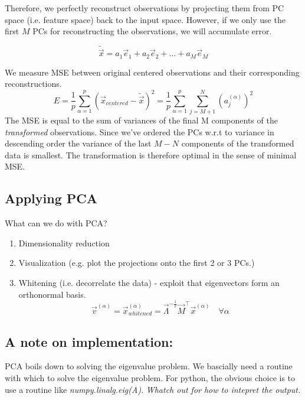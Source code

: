 Therefore, we perfectly reconstruct observations by projecting them from PC space (i.e. feature space) back to the input space. 
However, if we only use the first $M$ PCs for reconstructing the observations, we will accumulate error.

$$
\widetilde{\vec{x}} = a_1 \vec{e}_1 + a_2 \vec{e}_2 + \ldots
		+ a_M \vec{e}_M
$$
		
We measure MSE between original centered observations and their corresponding reconstructions.
$$
E = \frac{1}{p} \sum_{\alpha = 1}^{p} (\vec x_{centered} - \widetilde{\vec{x}})^2 = \frac{1}{p} \sum_{\alpha = 1}^{p} \sum_{j = M+1}^{N} (a_j^{(\alpha)})^2
$$
The MSE is equal to the sum of variances of the final M components of the \emph{transformed} observations. Since we've ordered the PCs w.r.t to variance in descending order the variance of the last $M-N$ components of the transformed data is smallest.
The transformation is therefore optimal in the sense of minimal MSE.


\subsection{Applying PCA}
What can we do with PCA?
\begin{enumerate}
\item Dimensionality reduction
\item Visualization (e.g. plot the projections onto the first 2 or 3 PCs.)
\item Whitening (i.e. decorrelate the data) - exploit that eigenvectors form an orthonormal basis.
$$
\vec v^{(\alpha)} = \vec x_{whitened}^{(\alpha)} = \vec{\Lambda}^{-\frac{1}{2}}\vec{M}^\top\vec{x}^{(\alpha)}
\quad
\forall \alpha
$$


\end{enumerate}

\newpage
\subsection{A note on implementation:}


PCA boils down to solving the eigenvalue problem.
We bascially need a routine with which to solve the eigenvalue problem. For python, the obvious choice is to use a routine like \textit{numpy.linalg.eig(A)}. \emph{Whatch out for how to intepret the output.}

